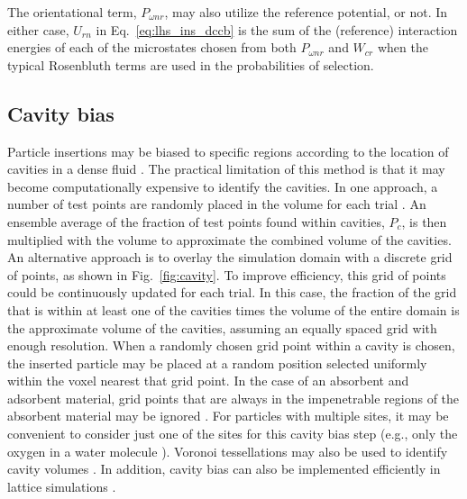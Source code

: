 The orientational term, $P_{\omega nr}$, may also utilize the reference potential, or not.
In either case, $U_{rn}$ in Eq.~\ref{eq:lhs_ins_dccb} is the sum of the (reference) interaction energies of each of the microstates chosen from both $P_{\omega nr}$ and $W_{cr}$ when the typical Rosenbluth terms are used in the probabilities of selection.

\subsection{\label{sec:lhs_insdel_cavity}Cavity bias}

Particle insertions may be biased to specific regions according to the location of cavities in a dense fluid \cite{mezei_cavity-biased_1980, mezei_grand-canonical_1987, snurr_prediction_1993, ikeda_generalization_2024}.
The practical limitation of this method is that it may become computationally expensive to identify the cavities.
In one approach, a number of test points are randomly placed in the volume for each trial \cite{mezei_cavity-biased_1980, mezei_grand-canonical_1987, snurr_prediction_1993}.
An ensemble average of the fraction of test points found within cavities, $P_c$, is then multiplied with the volume to approximate the combined volume of the cavities.
An alternative approach is to overlay the simulation domain with a discrete grid of points, as shown in Fig.~\ref{fig:cavity}.
To improve efficiency, this grid of points could be continuously updated for each trial.
In this case, the fraction of the grid that is within at least one of the cavities times the volume of the entire domain is the approximate volume of the cavities, assuming an equally spaced grid with enough resolution.
When a randomly chosen grid point within a cavity is chosen, the inserted particle may be placed at a random position selected uniformly within the voxel nearest that grid point.
In the case of an absorbent and adsorbent material, grid points that are always in the impenetrable regions of the absorbent material may be ignored \cite{snurr_prediction_1993}.
For particles with multiple sites, it may be convenient to consider just one of the sites for this cavity bias step (e.g., only the oxygen in a water molecule \cite{zhang_computational_2017}).
Voronoi tessellations may also be used to identify cavity volumes \cite{sastry_statistical_1997}.
In addition, cavity bias can also be implemented efficiently in lattice simulations \cite{barnes_structure_2009}.

